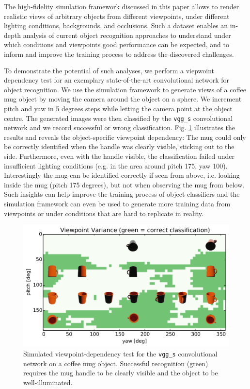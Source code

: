 \documentclass[letterpaper, 10 pt, conference]{ieeeconf}  %
\begin{document}
The high-fidelity simulation framework discussed in this paper allows to render realistic views of arbitrary objects from different viewpoints, under different lighting conditions, backgrounds, and occlusions. Such a dataset enables an in-depth analysis of current object recognition approaches to understand under which conditions and viewpoints good performance can be expected, and to inform and improve the training process to address the discovered challenges.

To demonstrate the potential of such analyses, we perform a viepwoint dependency test for an exemplary state-of-the-art convolutional network for object recognition. We use the simulation framework to generate views of a coffee mug object by moving the camera around the object on a sphere. We increment pitch and yaw in 5 degrees steps while letting the camera point at the object centre. The generated images were then classified by the \texttt{vgg\_s} convolutional network \cite{Chatfield14} and we record successful or wrong classification. Fig. \ref{fig:obj-recognition} illustrates the results and reveals the object-specific viewpoint dependency: The mug could only be correctly identified when the handle was clearly visible, sticking out to the side. Furthermore, even with the handle visible, the classification failed under insufficient lighting conditions (e.g. in the area around pitch 175, yaw 100). Interestingly the mug can be identified correctly if seen from above, i.e. looking inside the mug (pitch 175 degrees), but not when observing the mug from below. Such insights can help improve the training process of object classifiers and the simulation framework can even be used to generate more training data from viewpoints or under conditions that are hard to replicate in reality.



\begin{figure}[t]
    \includegraphics[width=\linewidth]{object_recognition.pdf}
    \caption{Simulated viewpoint-dependency test for the \texttt{vgg\_s} convolutional network \cite{Chatfield14} on a coffee mug object. Successful recognition (green) requires the mug handle to be clearly visible and the object to be well-illuminated.}
    \label{fig:obj-recognition}
\end{figure}
\end{document}
